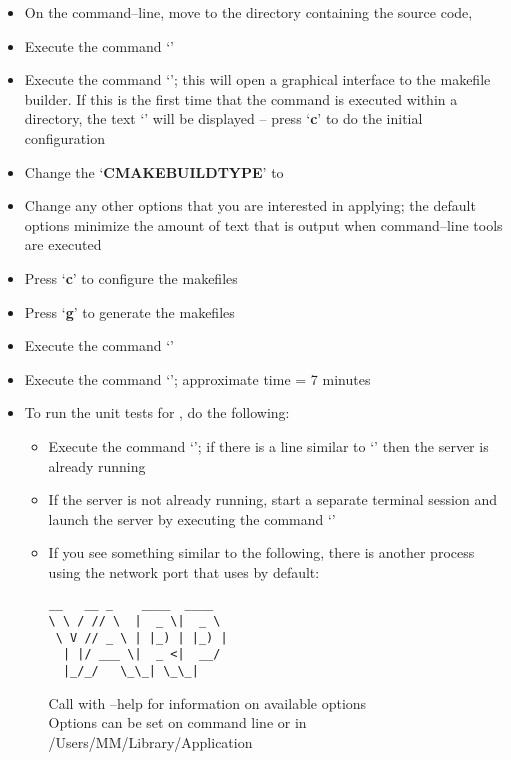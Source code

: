 \begin{itemize}
\item On the command--line, move to the directory containing the \mplusm{} source code,
\item Execute the command `'
\item Execute the command `'; this will open a graphical interface to the
makefile builder. If this is the first time that the command is executed within a
directory, the text `' will be displayed -- press `\textbf{c}' to do
the initial configuration
\item Change the `\textbf{CMAKE\fUS{}BUILD\fUS{}TYPE}' to 
\item Change any other options that you are interested in applying; the default options
minimize the amount of text that is output when \mplusm{} command--line tools are
executed
\item Press `\textbf{c}' to configure the makefiles
\item Press `\textbf{g}' to generate the makefiles
\item Execute the command `'
\item Execute the command `'; approximate time = 7 minutes
\item To run the unit tests for \mplusm{}, do the following:
\begin{itemize}
\item Execute the command `'; if there is a line
similar to `' then the \yarp{}
server is already running
\item If the \yarp{} server is not already running, start a separate terminal session and
launch the \yarp{} server by executing the command `'
\item If you see something similar to the following, there is another process using the
network port that \yarp{} uses by default:
\outputBegin{}
\begin{verbatim}
__   __ _    ____  ____  
\ \ / // \  |  _ \|  _ \ 
 \ V // _ \ | |_) | |_) |
  | |/ ___ \|  _ <|  __/ 
  |_/_/   \_\_| \_\_|    
\end{verbatim}
Call with --help for information on available options\\
Options can be set on command line or in /Users/M\textunderscore{}M/Library/Application\\

\end{itemize}
\end{itemize}
